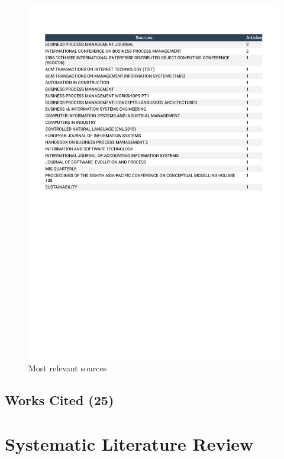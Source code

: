 \documentclass[
  letterpaper,
  DIV=11,
  numbers=noendperiod]{scrreprt}
\begin{document}
\begin{figure}

{\centering \includegraphics{./static/Most_Relevant_Sources.pdf}

}

\caption{\label{fig-sources}Most relevant sources}

\end{figure}

\newpage{}

\hypertarget{works-cited-25}{%
\section{Works Cited (25)}\label{works-cited-25}}

\hypertarget{systematic-literature-review}{%
\chapter{Systematic Literature
Review}\label{systematic-literature-review}}
\end{document}
